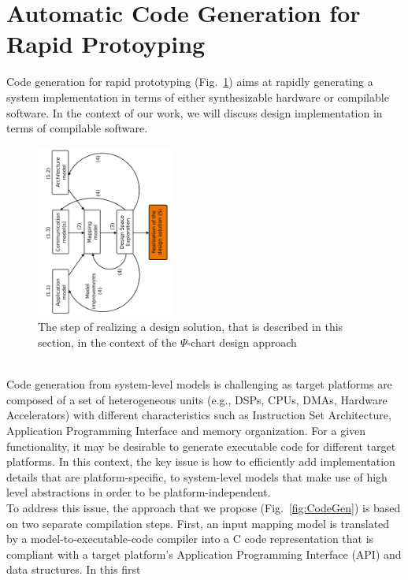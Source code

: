 \documentclass{llncs}
\begin{document}
\newpage
\section{Automatic Code Generation for Rapid Protoyping}
\label{sec:CodeGen}
%
Code generation for rapid prototyping (Fig.~\ref{fig:PsiChartReal}) aims at
rapidly generating a system implementation in terms of either synthesizable hardware or compilable software. In the context of our work, we will discuss design
implementation in terms of compilable software.
%
\begin{figure}[htbp]
	\centering
	\includegraphics[angle=-90,origin=c,width=0.4\textwidth]{figures/PsiChartReal.pdf}
	\caption{The step of realizing a design solution, that is described in this section, in the context of the
	$\Psi$-chart design approach}
	\label{fig:PsiChartReal}
\end{figure}
%
\\Code generation from system-level models is challenging as target platforms are composed of a set of heterogeneous
units (e.g., DSPs, CPUs, DMAs, Hardware Accelerators) with different characteristics such as Instruction Set
Architecture, Application Programming Interface and memory organization. For a given functionality, it may be desirable
to generate executable code for different target platforms. In this context, the key issue is how to efficiently add
implementation details that are platform-specific, to system-level models that make use of high level abstractions in
order to be platform-independent.\\
%
To address this issue, the approach that we propose (Fig.~\ref{fig:CodeGen}) is
based on two separate compilation steps.
First, an input mapping model is translated by a model-to-executable-code compiler into a C code representation that is
compliant with a target platform's Application Programming Interface (API) and data structures. In this first
\end{document}
